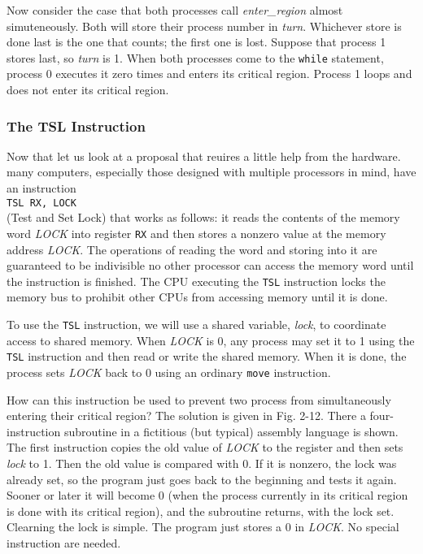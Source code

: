 \documentclass{book}
\newcommand {\sys} [1] {\textsl{#1}}
\newcommand {\cmd} [1] {\texttt{#1}}
\begin{document}
Now consider the case that both processes call \sys{enter\_region} almost simuteneously.
Both will store their process number in \sys{turn}.
Whichever store is done last is the one that counts; the first one is lost.
Suppose that process 1 stores last, so \sys{turn} is 1.
When both processes come to the \cmd{while} statement, process 0 executes it zero times and enters its critical region.
Process 1 loops and does not enter its critical region.

\subsubsection*{The TSL Instruction}
Now that let us look at a proposal that reuires a little help from the hardware.
many computers, especially those designed with multiple processors in mind, have an instruction\\
\cmd{TSL RX, LOCK}\\
(Test and Set Lock) that works as follows: 
it reads the contents of the memory word \sys{LOCK} into register \cmd{RX} 
and then stores a nonzero value at the memory address \sys{LOCK}.
The operations of reading the word and storing into it are guaranteed to be indivisible
no other processor can access the memory word until the instruction is finished.
The CPU executing the \cmd{TSL} instruction locks the memory bus to prohibit other CPUs from accessing memory until it is done.
 
To use the \cmd{TSL} instruction, we will use a shared variable, \sys{lock}, to coordinate access to shared memory.
When \sys{LOCK} is 0, any process may set it to 1 using the \cmd{TSL} instruction and then read or write the shared memory.
When it is done, the process sets \sys{LOCK} back to 0 using an ordinary \cmd{move} instruction.

How can this instruction be used to prevent two process from simultaneously entering their critical region?
The solution is given in Fig. 2-12.
There a four-instruction subroutine in a fictitious (but typical) assembly language is shown.
The first instruction copies the old value of \sys{LOCK} to the register and then sets \sys{lock} to 1.
Then the old value is compared with 0.
If it is nonzero, the lock was already set, so the program just goes back to the beginning and tests it again.
Sooner or later it will become 0 (when the process currently in its critical region is done with its critical region),
and the subroutine returns, with the lock set.
Clearning the lock is simple.
The program just stores a 0 in \sys{LOCK}.
No special instruction are needed.
\end{document}
